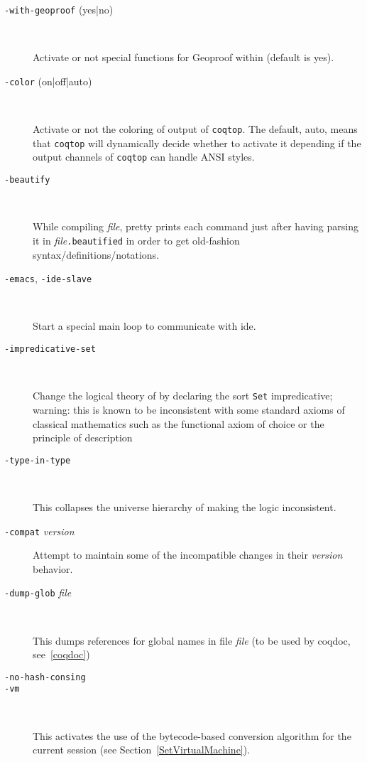 \begin{description}
\item[{\tt -with-geoproof} (yes|no)]\ 

  Activate or not special functions for Geoproof within {\CoqIDE} (default is yes).

\item[{\tt -color} (on|off|auto)]\

  Activate or not the coloring of output of {\tt coqtop}. The default, auto,
  means that {\tt coqtop} will dynamically decide whether to activate it
  depending if the output channels of {\tt coqtop} can handle ANSI styles.

\item[{\tt -beautify}]\ 

  While compiling {\em file}, pretty prints each command just after having parsing
  it in {\em file}{\tt .beautified} in order to get old-fashion
  syntax/definitions/notations.

\item[{\tt -emacs}, {\tt -ide-slave}]\ 

  Start a special main loop to communicate with ide.

\item[{\tt -impredicative-set}]\ 

  Change the logical theory of {\Coq} by declaring the sort {\tt Set}
  impredicative; warning: this is known to be inconsistent with
  some standard axioms of classical mathematics such as the functional
  axiom of choice or the principle of description

\item[{\tt -type-in-type}]\

  This collapses the universe hierarchy of {\Coq} making the logic inconsistent.

\item[{\tt -compat} {\em version}] \mbox{}

  Attempt to maintain some of the incompatible changes in their {\em version}
  behavior.

\item[{\tt -dump-glob} {\em file}]\ 

  This dumps references for global names in file {\em file}
  (to be used by coqdoc, see~\ref{coqdoc})

\item[{\tt -no-hash-consing}] \mbox{}

\item[{\tt -vm}]\ 

  This activates the use of the bytecode-based conversion algorithm
  for the current session (see Section~\ref{SetVirtualMachine}).


\end{description}

